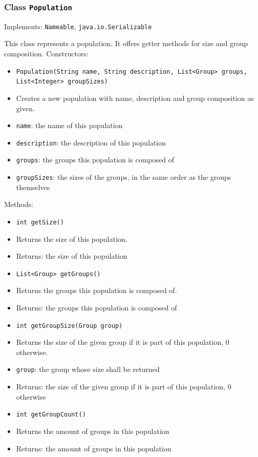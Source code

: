 \documentclass[parskip=full,11pt]{scrartcl}
\begin{document}
\subsubsection{Class \texttt{Population}}
Implements: \texttt{Nameable}, \texttt{java.io.Serializable}

This class represents a population. It offers getter methods for size and group composition.
\newpage
Constructors:
\begin{itemize}\itemsep -10pt
\item \texttt{Population(String name, String description, List<Group> groups, List<Integer> groupSizes)}
\item[] Creates a new population with name, description and group composition as given.
\item[] \texttt{name}: the name of this population
\item[] \texttt{description}: the description of this population
\item[] \texttt{groups}: the groups this population is composed of
\item[] \texttt{groupSizes}: the sizes of the groups, in the same order as the groups themselves
\end{itemize}

Methods:
\begin{itemize}\itemsep -10pt
\item \texttt{int getSize()}
\item[] Returns the size of this population.
\item[] Returns: the size of this population

\item \texttt{List<Group> getGroups()}
\item[] Returns the groups this population is composed of.
\item[] Returns: the groups this population is composed of

\item \texttt{int getGroupSize(Group group)}
\item[] Returns the size of the given group if it is part of this population, \(0\) otherwise.
\item[] \texttt{group}: the group whose size shall be returned
\item[] Returns: the size of the given group if it is part of this population, \(0\) otherwise

\item \texttt{int getGroupCount()}
\item[] Returns the amount of groups in this population
\item[] Returns: the amount of groups in this population
\end{itemize}
\end{document}
